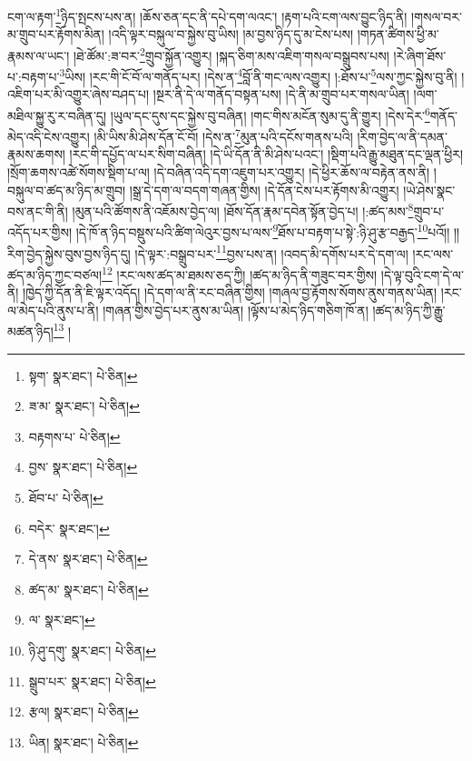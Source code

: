 ངག་ལ་རྟག་\footnote{སྟག་  སྣར་ཐང་།  པེ་ཅིན། }ཉིད་སྤངས་པས་ན། །ཆོས་ཅན་དང་ནི་དཔེ་དག་ལའང་། །རྟག་པའི་ངག་ལས་བྱུང་ཉིད་ནི། །གསལ་བར་མ་གྲུབ་པར་རྟོགས་མིན། །འདི་ལྟར་བསྐུལ་བ་སྐྱེས་བུ་ཡིས། །མ་བྱས་ཉིད་དུ་མ་ངེས་པས། །གཏན་ཚིགས་ཕྱི་མ་རྣམས་ལ་ཡང་། །ཐེ་ཚོམ་:ཟ་བར་\footnote{ཟ་མ་  སྣར་ཐང་།  པེ་ཅིན། }གྲུབ་སྐྱོན་འགྱུར། །སྐད་ཅིག་མས་འཇིག་གསལ་བསྒྲུབས་པས། །རེ་ཞིག་ཐོས་པ་:བརྟག་པ་\footnote{བརྟགས་པ་  པེ་ཅིན། }ཡིས། །རང་གི་ངོ་བོ་ལ་གནོད་པར། །དེས་ན་\footnote{བྱས་  སྣར་ཐང་།  པེ་ཅིན། }བློ་ནི་གང་ལས་འགྱུར། །:ཐོས་པ་\footnote{ཐོབ་པ་  པེ་ཅིན། }ལས་ཀྱང་སྐྱེས་བུ་ནི། །འཇིག་པར་མི་འགྱུར་ཞེས་བཤད་པ། །སྔར་ནི་དེ་ལ་གནོད་བསྟན་པས། །དེ་ནི་མ་གྲུབ་པར་གསལ་ཡིན། །ལག་མཐིལ་སྐྱུ་རུ་ར་བཞིན་དུ། །ཡུལ་དང་དུས་དང་སྐྱེས་བུ་བཞིན། །གང་གིས་མངོན་སུམ་དུ་ནི་གྱུར། །དེས་དེར་\footnote{བདེར་  སྣར་ཐང་། }གནོད་མེད་འདི་ངེས་འགྱུར། །མི་ཡིས་མི་ཤེས་དོན་ངོ་བོ། །དེས་ན་\footnote{དེ་ནས་  སྣར་ཐང་།  པེ་ཅིན། }མུན་པའི་དངོས་གནས་པའི། །རིག་བྱེད་ལ་ནི་དམན་རྣམས་ཆགས། །རང་གི་དཔྱོད་ལ་པར་སིག་བཞིན། །དེ་ཡི་དོན་ནི་མི་ཤེས་པའང་། །སྡིག་པའི་རྒྱུ་མཐུན་དང་ལྡན་ཕྱིར། །སྲོག་ཆགས་འཚེ་སོགས་སྡིག་པ་ལ། །དེ་བཞིན་འདི་དག་འཇུག་པར་འགྱུར། །དེ་ཕྱིར་ཆོས་ལ་བརྟེན་ནས་ནི། །བསྐུལ་བ་ཚད་མ་ཉིད་མ་གྲུབ། །སྒྲ་དེ་དག་ལ་བདག་གཞན་གྱིས། །དེ་དོན་ངེས་པར་རྟོགས་མི་འགྱུར། །ཡེ་ཤེས་སྣང་བས་ནང་གི་ནི། །མུན་པའི་ཚོགས་ནི་འཇོམས་བྱེད་ལ། །ཐོས་དོན་རྣམ་དབེན་སྟོན་བྱེད་པ། །:ཚད་མས་\footnote{ཚད་མ་  སྣར་ཐང་།  པེ་ཅིན། }གྲུབ་པ་འདོད་པར་གྱིས། །དེ་ཁོ་ན་ཉིད་བསྡུས་པའི་ཚིག་ལེའུར་བྱས་པ་ལས་\footnote{ལ་  སྣར་ཐང་། }ཐོས་པ་བརྟག་པ་སྟེ་:ཉི་ཤུ་རྩ་བརྒྱད་\footnote{ཉི་ཤུ་དགུ་  སྣར་ཐང་།  པེ་ཅིན། }པའོ།། །།རིག་བྱེད་སྐྱེས་བུས་བྱས་ཉིད་དུ། །དེ་ལྟར་:བསྒྲུབ་པར་\footnote{སྒྲུབ་པར་  སྣར་ཐང་།  པེ་ཅིན། }བྱས་པས་ན། །འབད་མི་དགོས་པར་དེ་དག་ལ། །རང་ལས་ཚད་མ་ཉིད་ཀྱང་བཙལ།\footnote{རྩལ།  སྣར་ཐང་།  པེ་ཅིན། } །རང་ལས་ཚད་མ་ཐམས་ཅད་ཀྱི། །ཚད་མ་ཉིད་ནི་གཟུང་བར་གྱིས། །དེ་ལྟ་བུའི་ངག་དེ་ལ་ནི། །ཁྱེད་ཀྱི་དོན་ནི་ཇི་ལྟར་འདོད། །དེ་དག་ལ་ནི་རང་བཞིན་གྱིས། །གཞལ་བྱ་རྟོགས་སོགས་ནུས་གནས་ཡིན། །རང་ལ་མེད་པའི་ནུས་པ་ནི། །གཞན་གྱིས་བྱེད་པར་ནུས་མ་ཡིན། །ལྟོས་པ་མེད་ཉིད་གཅིག་ཁོ་ན། །ཚད་མ་ཉིད་ཀྱི་རྒྱུ་མཚན་ཉིད།\footnote{ཡིན།  སྣར་ཐང་།  པེ་ཅིན། } །
